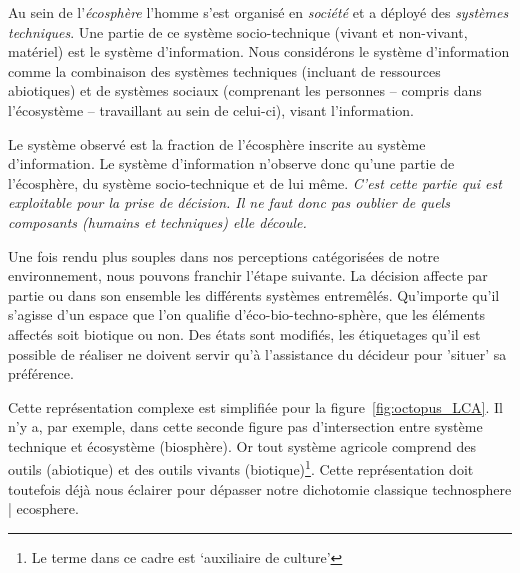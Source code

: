 {Au sein de l'\emph{écosphère} l'homme s'est organisé en \emph{société} et a déployé des \emph{systèmes techniques}.
Une partie de ce système socio-technique (vivant et non-vivant, matériel) est le système d'information.
Nous considérons le système d'information comme la combinaison des systèmes techniques (incluant de ressources abiotiques) et de systèmes sociaux (comprenant les personnes -- compris dans l'écosystème -- travaillant au sein de celui-ci), visant l'information.

Le système observé est la fraction de l'écosphère inscrite au système d'information.
Le système d'information n'observe donc qu'une partie de l'écosphère, du système socio-technique et de lui même.
\emph{C'est cette partie qui est exploitable pour la prise de décision.
Il ne faut donc pas oublier de quels composants (humains et techniques) elle découle.}

Une fois rendu plus souples dans nos perceptions catégorisées de notre environnement, nous pouvons franchir l'étape suivante.
La décision affecte par partie ou dans son ensemble les différents systèmes entremêlés.
Qu'importe qu'il s'agisse d'un espace que l'on qualifie d'éco-bio-techno-sphère, que les éléments affectés soit biotique ou non.
Des états sont modifiés, les étiquetages qu'il est possible de réaliser ne doivent servir qu'à l’assistance du décideur pour 'situer' sa préférence.
%
%
%
}
Cette représentation complexe est simplifiée pour la figure~\ref{fig:octopus_LCA}.
Il n'y a, par exemple, dans cette seconde figure pas d'intersection entre système technique et écosystème (biosphère).
Or tout système agricole comprend des outils (abiotique) et des outils vivants (biotique)\footnote{Le terme dans ce cadre est `auxiliaire de culture'}.
Cette représentation doit toutefois déjà nous éclairer pour dépasser notre dichotomie classique \Gls{technosphere} | \Gls{ecosphere}.

